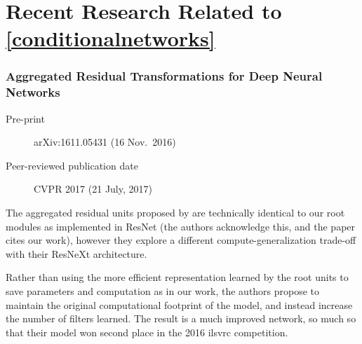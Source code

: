 \documentclass[thesis]{subfiles}
\begin{document}



\section{Recent Research Related to \cref{conditionalnetworks}}

\subsubsection*{Aggregated Residual Transformations for Deep Neural Networks}
\begin{description}
    \item[Pre-print] arXiv:1611.05431 (16 Nov.\ 2016)
    \item[Peer-reviewed publication date] CVPR 2017 (21 July, 2017)
\end{description}
The aggregated residual units proposed by \citet{saining2017} are technically identical to our root modules as implemented in ResNet (the authors acknowledge this, and the paper cites our work), however they explore a different compute-generalization trade-off with their ResNeXt architecture. 

Rather than using the more efficient representation learned by the root units to save parameters and computation as in our work, the authors propose to maintain the original computational footprint of the model, and instead increase the number of filters learned. The result is a much improved network, so much so that their model won second place in the 2016 \gls{ilsvrc} competition. 
\end{document}
